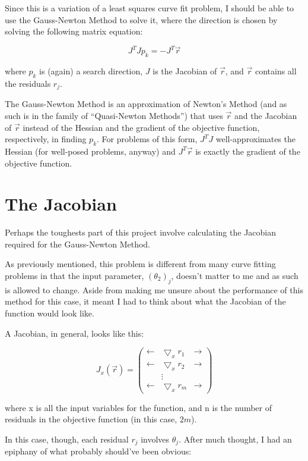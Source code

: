 \documentclass[12pt, letterpaper]{article}
\begin{document}
Since this is a variation of a least squares curve fit problem, I should be able to use the Gauss-Newton Method to solve it, where the direction is chosen by solving the following matrix equation:

\[J^TJp_{k}=-J^T\vec{r}\]

where \(p_k\) is (again) a search direction, \(J\) is the Jacobian of \(\vec{r}\), and \(\vec{r}\) contains all the residuals \(r_j\).

The Gauss-Newton Method is an approximation of Newton's Method (and as such is in the family of ``Quasi-Newton Methods'') that uses \(\vec{r}\) and the Jacobian of \(\vec{r}\) instead of the Hessian and the gradient of the objective function, respectively, in finding \(p_k\). For problems of this form, \(J^TJ\) well-approximates the Hessian (for well-posed problems, anyway) and \(J^T\vec{r}\) is exactly the gradient of the objective function.

\section*{The Jacobian}

Perhaps the toughests part of this project involve calculating the Jacobian required for the Gauss-Newton Method.

As previously mentioned, this problem is different from many curve fitting problems in that the input parameter, \((\theta_2)_j\), doesn't matter to me and as such is allowed to change. Aside from making me unsure about the performance of this method for this case, it meant I had to think about what the Jacobian of the function would look like.

A Jacobian, in general, looks like this:

\[J_x(\vec{r})=\begin{pmatrix}
\leftarrow & \bigtriangledown_xr_1 & \rightarrow \\
\leftarrow & \bigtriangledown_xr_2 & \rightarrow \\
& \vdots & \\
\leftarrow & \bigtriangledown_xr_m & \rightarrow
\end{pmatrix}\]

where x is all the input variables for the function, and n is the number of residuals in the objective function (in this case, \(2m\)).

In this case, though, each residual \(r_j\) involves \(\theta_j\). After much thought, I had an epiphany of what probably should've been obvious:
\end{document}
